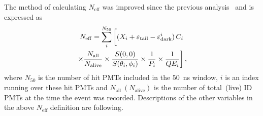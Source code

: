 \documentclass[aps,prd,reprint,superscriptaddress,floatfix,altaffilletter,nofootinbib]{revtex4-2}
\begin{document}
The method of calculating $N_{\mathrm{eff}}$  was improved since the previous analysis~\cite{Abe:2016nxk} and is expressed as
\begin{multline}
  \label{eq:neff}
  N_{\mathrm{eff}} = \sum_i^{N_{50}} 
  \left[ 
    \vphantom{\frac{(}{)}}  (X_{i} + \varepsilon_{\mathrm{tail}} -\varepsilon_{\mathrm{dark}}^{i})\,C_{i}
    \right. \\
    \left.
    \times \frac{N_{\mathrm{all}}}{N_{\mathrm{alive}}}
    \times \frac{S(0,0)}{S(\theta_{i},\phi_{i})}  \times \frac{1}{P_i} \times \frac{1}{QE_{i}}
  \right],
\end{multline}
where $N_{50}$ is the number of hit PMTs included in the $50$~ns window, $i$ is an index running over these hit PMTs and $N_{\mathrm{all}}~(N_{\mathrm{alive}})$ is the number of total~(live) ID PMTs at the time the event was recorded.
Descriptions of the other variables in the above $N_{\mathrm{eff}}$ definition are following.
\end{document}
